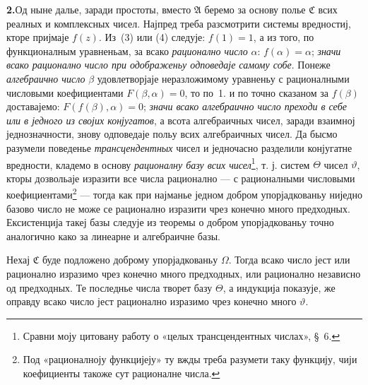 ﻿\documentclass[11pt]{article}
\providecommand{\Afield}{\mathfrak A}
\providecommand{\Cfield}{\mathfrak C}
\begin{document}

\medskip
\noindent\textbf{2.}\quad Од ныне далье, заради простоты, вместо \(\Afield\) беремо за основу полье \(\Cfield\) всих реалных и комплексных чисел. Најпред треба разсмотрити системы вредностиј, кторе пријмаје \(f(z)\). Из~(3) или (4) следује: \(f(1)=1\), а из того, по функционалным уравненьам, за всако {\itshape рационално число} \(\alpha\): \(f(\alpha)=\alpha\); {\itshape значи всако рационално число при одображеньу одповедаје самому собе}. Понеже {\itshape алгебраично число} \(\beta\) удовлетворјаје неразложимому уравненьу с рационалными числовыми коефициентами \(F(\beta,\alpha)=0\), то по~1. и по точно сказаном за \(f(\beta)\) доставајемо: \(F(f(\beta),\alpha)=0\); {\itshape значи всако алгебраично число преходи в себе или в једного из својих конјугатов}, а всота алгебраичных чисел, заради взаимној једнозначности, знову одповедаје польу всих алгебраичных чисел. Да бысмо разумели поведенье {\itshape трансцендентных} чисел и једночасно разделили конјугатне вредности, кладемо в основу {\itshape рационалну базу всих чисел}\footnote{Сравни моју цитовану работу о «целых трансцендентных числах», \S\ 6.}, т. ј. систем \(\Theta\) чисел \(\vartheta\), кторы дозвольаје изразити все числа рационално --- с рационалными числовыми коефициентами\footnote{Под «рационалноју функцијеју» ту вжды треба разумети таку функцију, чији коефициенты такоже сут рационалне числа.} --- тогда как при најманье једном добром упорјадкованьу ниједно базово число не може се рационално изразити чрез конечно много предходных. Ексистенција такеј базы следује из теоремы о добром упорјадкованьу точно аналогично како за линеарне и алгебраичне базы.

Нехај \(\Cfield\) буде подложено доброму упорјадкованьу \(\Omega\). Тогда всако число јест или рационално изразимо чрез конечно много предходных, или рационално независно од предходных. Те последнье числа творет базу \(\Theta\), а индукција показује, же оправду всако число јест рационално изразимо чрез конечно много \(\vartheta\).
\end{document}
